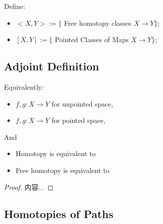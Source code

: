 \documentclass[Total.tex]{subfiles}
\begin{document}
			\begin{Def}
				Define:
				\begin{itemize}
					\item $<X,Y>:=\{$ Free homotopy classes $X\rightarrow Y\}$;
					\item $[X,Y]:=\{$ Pointed Classes of Maps $X\rightarrow Y\}$;
				\end{itemize}
			\end{Def}
			\subsection{Adjoint Definition}
				Equivalently:
				\begin{Def}
					\begin{itemize}
						\item $f,g:X\rightarrow Y$ for unpointed space,
						\begin{center}
						\end{center}
						\item $f,g:X\rightarrow Y$ for pointed space,
						\begin{center}
						\end{center}
					\end{itemize}
				\end{Def}
				
				And
				\begin{proposition}
					\begin{itemize}
						\item Homotopy is equivalent to
						\item Free homotopy is equivalent to
					\end{itemize}
				\end{proposition}
				\begin{proof}
					内容...
				\end{proof}
			\subsection{Homotopies of Paths}
\end{document}
